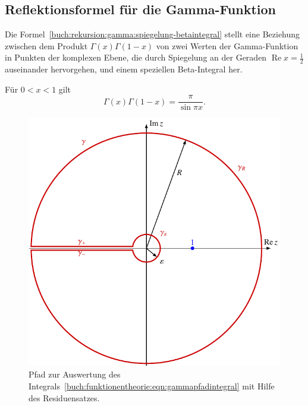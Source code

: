 %
%
%
\subsection{Reflektionsformel für die Gamma-Funktion
\label{buch:funktionentheorie:subsection:gammareflektion}}
Die Formel~\eqref{buch:rekursion:gamma:spiegelung-betaintegral}
stellt eine Beziehung zwischen dem Produkt $\Gamma(x)\Gamma(1-x)$
von zwei Werten der Gamma-Funktion in Punkten der komplexen Ebene,
die durch Spiegelung an der Geraden $\operatorname{Re}x=\frac12$
auseinander hervorgehen, und einem speziellen Beta-Integral her.

\begin{satz}
%
\label{buch:funktionentheorie:satz:spiegelungsformel}
Für $0<x<1$ gilt
\begin{equation}
\Gamma(x)\Gamma(1-x)
=
\frac{\pi}{\sin\pi x}.
\end{equation}
%
\end{satz}

\begin{figure}
\centering
\includegraphics{chapters/080-funktionentheorie/images/gammapfad.pdf}
\caption{Pfad zur Auswertung des
Integrals~\eqref{buch:funktionentheorie:eqn:gammapfadintegral}
mit Hilfe des Residuensatzes.
\label{buch:funktionentheorie:fig:gammapfad}}
\end{figure}

